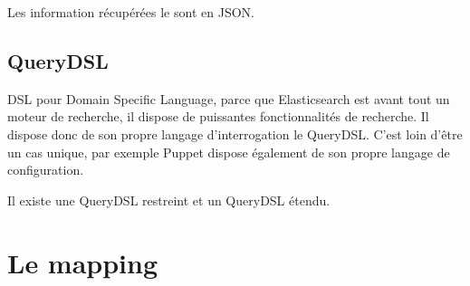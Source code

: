 Les information récupérées le sont en JSON.

\subsection{QueryDSL}
DSL pour Domain Specific Language, parce que Elasticsearch est avant tout un moteur 
de recherche, il dispose de puissantes fonctionnalités de recherche. Il dispose donc
de son propre langage d'interrogation le QueryDSL. C'est loin d'être un cas unique,
par exemple Puppet dispose également de son propre langage de configuration.

Il existe une QueryDSL restreint et un QueryDSL étendu.



\section{Le mapping}
